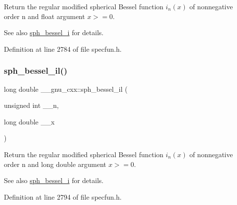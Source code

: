 Return the regular modified spherical Bessel function $ i_n(x) $ of nonnegative order n and {\ttfamily float} argument $ x >= 0 $.

\begin{DoxySeeAlso}{See also}
\hyperlink{group__gnu__math__spec__func_ga156b8154b27b7898c8b2abf4284f7323}{sph\+\_\+bessel\+\_\+i} for details. 
\end{DoxySeeAlso}


Definition at line 2784 of file specfun.\+h.

\mbox{\label{group__gnu__math__spec__func_gaf4392d9ed177913febdcbfccb947dbca}} 
\subsubsection{\texorpdfstring{sph\+\_\+bessel\+\_\+il()}{sph\_bessel\_il()}}
{\footnotesize\ttfamily long double \+\_\+\+\_\+gnu\+\_\+cxx\+::sph\+\_\+bessel\+\_\+il (\begin{DoxyParamCaption}\item[{unsigned int}]{\+\_\+\+\_\+n,  }\item[{long double}]{\+\_\+\+\_\+x }\end{DoxyParamCaption})\hspace{0.3cm}{\ttfamily [inline]}}

Return the regular modified spherical Bessel function $ i_n(x) $ of nonnegative order n and {\ttfamily long double} argument $ x >= 0 $.

\begin{DoxySeeAlso}{See also}
\hyperlink{group__gnu__math__spec__func_ga156b8154b27b7898c8b2abf4284f7323}{sph\+\_\+bessel\+\_\+i} for details. 
\end{DoxySeeAlso}


Definition at line 2794 of file specfun.\+h.

\mbox{\label{group__gnu__math__spec__func_ga288b28f2c6995d052a4f5f17293cbf1a}} 
